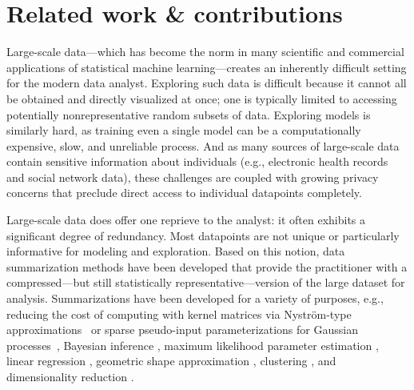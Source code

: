 \section{Related work \& contributions}
\label{sec:intro}

Large-scale data---which has become the norm in many scientific and commercial applications of statistical machine learning---creates
an inherently difficult setting for the modern data analyst. Exploring such data is difficult because it cannot all be
obtained and directly visualized at once; one is typically limited to accessing potentially nonrepresentative random subsets of data.
Exploring models is similarly hard, as training even a single model can be a computationally expensive, slow, and unreliable process.
And as many sources of large-scale data contain sensitive information about 
individuals (e.g., electronic health records and social network data),
these challenges are coupled with growing privacy concerns  that preclude direct access to individual datapoints completely. 

Large-scale data does offer one reprieve to the analyst: it often exhibits a significant degree of redundancy. Most datapoints are 
not unique or particularly informative for modeling and exploration. Based on this notion, data summarization methods have been developed  
that provide the practitioner with a compressed---but still statistically representative---version of the large dataset for analysis.
Summarizations have been developed for a variety of purposes, e.g., reducing the cost of computing with kernel matrices via Nystr{\"o}m-type approximations~\citep{drineas05,musco17,agrawal19} or sparse pseudo-input parameterizations for Gaussian processes~\citep{williams01,csato02,snelson05,titsias09},
Bayesian inference \citep{huggins16,huggins17,campbell18,campbell19jmlr}, maximum likelihood 
parameter estimation \citep{dumouchel99,madigan02}, 
linear regression \citep{zhou08,guhaniyogi15},
geometric shape approximation \citep{agarwal05},
clustering \citep{feldman11,lucic16,bachem15,braverman16}, and dimensionality reduction \citep{feldman16}.

